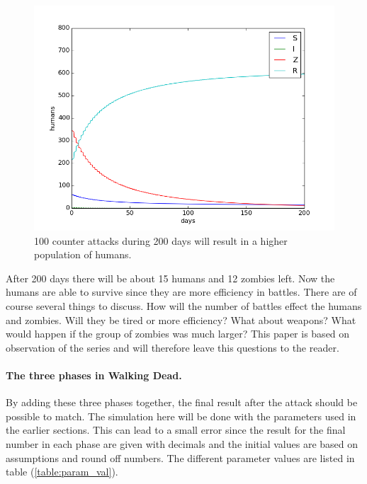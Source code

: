 \documentclass[%
twoside,                 %
final,                   %
10pt]{article}
\begin{document}
\begin{figure}[ht]
  \centerline{\includegraphics[width=0.9\linewidth]{plots/WD_zombie_counter_series.png}}
  \caption{
  \label{fig:counter_series} 100 counter attacks during 200 days will result in a higher population of humans.
  }
\end{figure}


After 200 days there will be about 15 humans and 12 zombies left. Now the humans are able to survive since they are more efficiency in battles. There are of course several things to discuss. How will the number of battles effect the humans and zombies. Will they be tired or more efficiency? What about weapons? What would happen if the group of zombies was much larger? This paper is based on observation of the series and will therefore leave this questions to the reader. 

\paragraph{The three phases in Walking Dead.}
By adding these three phases together, the final result after the attack should be possible to match. The simulation here will be done with the parameters used in the earlier sections. This can lead to a small error since the result for the final number in each phase are given with decimals and the initial values are based on assumptions and round off numbers. The different parameter values are listed in table (\ref{table:param_val}). 
\end{document}
